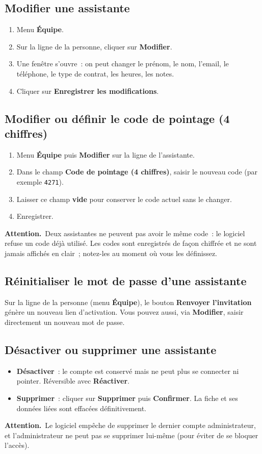 \documentclass[11pt,a4paper]{article}
\newcommand{\encadre}[2]{%
  \par\smallskip\noindent
  \colorbox{#1}{\parbox{\dimexpr\linewidth-2\fboxsep}{\smallskip #2\smallskip}}%
  \par\smallskip}
\newcommand{\attention}[1]{\encadre{ambrelight}{\textbf{\textcolor{ambre}{Attention.}}~#1}}
\newcommand{\menu}[1]{\textbf{\textcolor{faraday}{#1}}}
\begin{document}
\subsection{Modifier une assistante}
\begin{enumerate}[leftmargin=1.6em]
  \item Menu \menu{Équipe}.
  \item Sur la ligne de la personne, cliquer sur \menu{Modifier}.
  \item Une fenêtre s'ouvre~: on peut changer le prénom, le nom, l'email, le téléphone, le type de contrat, les heures, les notes.
  \item Cliquer sur \menu{Enregistrer les modifications}.
\end{enumerate}

\subsection{Modifier ou définir le code de pointage (4 chiffres)}
\begin{enumerate}[leftmargin=1.6em]
  \item Menu \menu{Équipe} puis \menu{Modifier} sur la ligne de l'assistante.
  \item Dans le champ \menu{Code de pointage (4 chiffres)}, saisir le nouveau code (par exemple \texttt{4271}).
  \item Laisser ce champ \textbf{vide} pour conserver le code actuel sans le changer.
  \item Enregistrer.
\end{enumerate}

\attention{Deux assistantes ne peuvent pas avoir le même code~: le logiciel refuse un code déjà utilisé. Les codes sont enregistrés de façon chiffrée et ne sont jamais affichés en clair~; notez-les au moment où vous les définissez.}

\subsection{Réinitialiser le mot de passe d'une assistante}
Sur la ligne de la personne (menu \menu{Équipe}), le bouton \menu{Renvoyer l'invitation} génère un nouveau lien d'activation. Vous pouvez aussi, via \menu{Modifier}, saisir directement un nouveau mot de passe.

\subsection{Désactiver ou supprimer une assistante}
\begin{itemize}[leftmargin=1.4em]
  \item \menu{Désactiver}~: le compte est conservé mais ne peut plus se connecter ni pointer. Réversible avec \menu{Réactiver}.
  \item \menu{Supprimer}~: cliquer sur \menu{Supprimer} puis \menu{Confirmer}. La fiche et ses données liées sont effacées définitivement.
\end{itemize}
\attention{Le logiciel empêche de supprimer le dernier compte administrateur, et l'administrateur ne peut pas se supprimer lui-même (pour éviter de se bloquer l'accès).}
\end{document}
